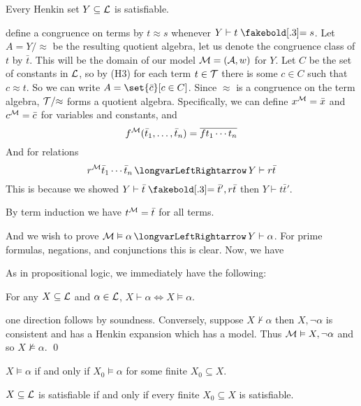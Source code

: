 \blemm

    Every Henkin set $Y\subseteq{\cal L}$ is satisfiable.

\elemm

\Proof define a congruence on terms by $t\approx s$ whenever $Y\vdash t\eq s$.
Let $A=Y/{\approx}$ be the resulting quotient algebra, let us denote the congruence class of $t$ by $\bar t$.
This will be the domain of our model ${\cal M}=({\cal A},w)$ for $Y$.
Let $C$ be the set of constants in ${\cal L}$, so by (H3) for each term $t\in{\cal T}$ there is some $c\in C$ such that $c\approx t$.
So we can write $A=\set{\bar c}[c\in C]$.
Since $\approx$ is a congruence on the term algebra, ${\cal T}/{\approx}$ forms a quotient algebra.
Specifically, we can define $x^{{\cal M}}=\bar x$ and $c^{{\cal M}}=\bar c$ for variables and constants, and
$$ f^{{\cal M}}(\bar t_1,\dots,\bar t_n) = \overline{ft_1\cdots t_n} $$
And for relations
$$ r^{\c M}\bar t_1\cdots\bar t_n \iff Y\vdash r\bar t $$
This is because we showed $Y\vdash\bar t\eq\bar t',r\bar t$ then $Y\vdash t\bar t'$.

By term induction we have $t^{{\cal M}}=\bar t$ for all terms.

And we wish to prove $\c M\vDash\alpha\iff Y\vdash\alpha$.
For prime formulas, negations, and conjunctions this is clear.
Now, we have

As in propositional logic, we immediately have the following:

\bthrm[title=Completeness]

    For any $X\subseteq{\cal L}$ and $\alpha\in{\cal L}$, $X\vdash\alpha\iff X\vDash\alpha$.

\ethrm

\Proof one direction follows by soundness.
Conversely, suppose $X\nvdash\alpha$ then $X,\neg\alpha$ is consistent and has a Henkin expansion which has a model.
Thus ${\cal M}\vDash X,\neg\alpha$ and so $X\nvDash\alpha$.
\qed

\bthrm[title=Finiteness]

    $X\vDash\alpha$ if and only if $X_0\vDash\alpha$ for some finite $X_0\subseteq X$.

\ethrm

\bthrm[title=Compactness]

    $X\subseteq{\cal L}$ is satisfiable if and only if every finite $X_0\subseteq X$ is satisfiable.

